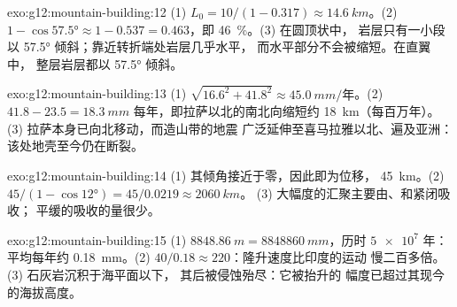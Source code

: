 \begin{solution}{exo:g12:mountain-building:12}
(1) $L_0 = 10/(1 - 0.317) \approx \qty{14.6}{km}$。(2) $1 - \cos\ang{57.5}
\approx 1 - 0.537 = 0.463$，即 \qty{46}{\percent}。(3) 在圆顶状中，
岩层只有一小段以 \ang{57.5} 倾斜；靠近转折端处岩层几乎水平，
而水平部分不会被缩短。在直翼中，
整层岩层都以 \ang{57.5} 倾斜。
\end{solution}

\begin{solution}{exo:g12:mountain-building:13}
(1) $\sqrt{16.6^2 + 41.8^2} \approx \qty{45.0}{mm/\text{年}}$。(2) $41.8 - 23.5 =
\qty{18.3}{mm}$ 每年，即拉萨以北的南北向缩短约
\qty{18}{km}（每百万年）。(3) 拉萨本身已向北移动，而造山带的地震
广泛延伸至喜马拉雅以北、遍及亚洲：
该处地壳至今仍在断裂。
\end{solution}

\begin{solution}{exo:g12:mountain-building:14}
(1) 其倾角接近于零，因此即为位移，
\qty{45}{km}。(2) $45/(1 - \cos\ang{12}) = 45/0.0219 \approx \qty{2060}{km}$。
(3) 大幅度的汇聚主要由、和紧闭吸收；
平缓的吸收的量很少。
\end{solution}

\begin{solution}{exo:g12:mountain-building:15}
(1) $\qty{8848.86}{m} = \qty{8848860}{mm}$，历时 $\num{5e7}$ 年：平均每年约
\qty{0.18}{mm}。(2) $40/0.18 \approx 220$：隆升速度比印度的运动
慢二百多倍。(3) 石灰岩沉积于海平面以下，
其后被侵蚀殆尽：它被抬升的
幅度已超过其现今的海拔高度。
\end{solution}

